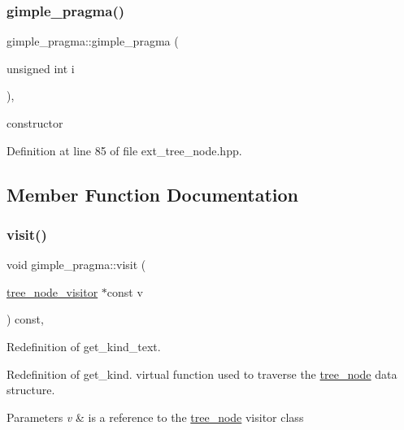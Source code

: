 \subsubsection{\texorpdfstring{gimple\+\_\+pragma()}{gimple\_pragma()}}
{\footnotesize\ttfamily gimple\+\_\+pragma\+::gimple\+\_\+pragma (\begin{DoxyParamCaption}\item[{unsigned int}]{i }\end{DoxyParamCaption})\hspace{0.3cm}{\ttfamily [inline]}, {\ttfamily [explicit]}}



constructor 



Definition at line 85 of file ext\+\_\+tree\+\_\+node.\+hpp.



\subsection{Member Function Documentation}
\mbox{\label{structgimple__pragma_ac7dac0c665ea703c9d8f0891016ef972}} 
\subsubsection{\texorpdfstring{visit()}{visit()}}
{\footnotesize\ttfamily void gimple\+\_\+pragma\+::visit (\begin{DoxyParamCaption}\item[{\hyperlink{classtree__node__visitor}{tree\+\_\+node\+\_\+visitor} $\ast$const}]{v }\end{DoxyParamCaption}) const\hspace{0.3cm}{\ttfamily [override]}, {\ttfamily [virtual]}}



Redefinition of get\+\_\+kind\+\_\+text. 

Redefinition of get\+\_\+kind. virtual function used to traverse the \hyperlink{classtree__node}{tree\+\_\+node} data structure. 
\begin{DoxyParams}{Parameters}
{\em v} & is a reference to the \hyperlink{classtree__node}{tree\+\_\+node} visitor class \\
\hline
\end{DoxyParams}


